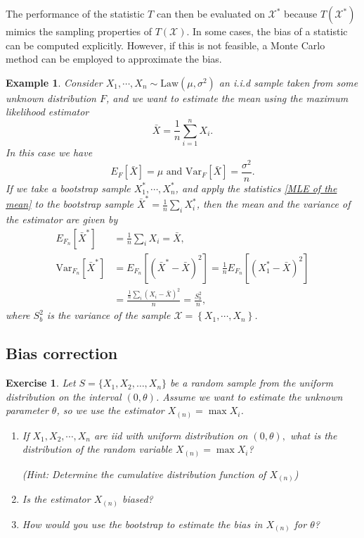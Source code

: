 \documentclass{article}\usepackage[]{graphicx}\usepackage[]{xcolor}
\newtheorem{exercise}{Exercise}
\newtheorem{example}{Example}
\begin{document}
The performance of the statistic $T$ can then be evaluated on $\mathcal{X}^*$ because $T(\mathcal{X}^*)$ mimics the sampling properties of $T(\mathcal{X})$. In some cases, the bias of a statistic can be computed explicitly. However, if this is not feasible, a Monte Carlo method can be employed to approximate the bias.


\begin{example}
Consider $X_1,\cdots, X_n \sim \text{Law}(\mu,\sigma^2)$ an i.i.d sample taken from some unknown distribution $F$, and we want to estimate the mean using the maximum likelihood estimator
\begin{equation}\label{MLE of the mean}
\bar{X} = \frac{1}{n} \sum\limits_{i=1}^nX_i.
\end{equation}
In this case we have 
\begin{equation}
E_F\left[ \bar{X} \right] = \mu \text{ and } \text{Var}_F\left[\bar{X}\right] = \frac{\sigma^2}{n}.
\end{equation}
If we take a bootstrap sample $X_1^*, \cdots, X_n^*$, and apply the statistics \eqref{MLE of the mean} to the bootstrap sample $\bar{X}^* = \frac{1}{n}\sum\limits_i X_i^*$, then the mean and the variance of the estimator are given by 
\begin{align*}
E_{F_n}\left[\bar{X}^*\right] &= \frac{1}{n}\sum\limits_i X_i = \bar{X},\\
\text{Var}_{F_n}\left[ \bar{X}^*\right] &= E_{F_n}\left[ \left(\bar{X}^* -\bar{X}\right)^2 \right]=\frac{1}{n}E_{F_n}\left[ \left( X_1^* - \bar{X}\right)^2 \right]\\
&= \frac{\frac{1}{n}\sum\limits_i (X_i - \bar{X})^2}{n} = \frac{S_b^2}{n},
\end{align*}
where $S_b^2$ is the variance of the sample $\mathcal{X} = \left\lbrace X_1, \cdots, X_n\right\rbrace$.
\end{example}

\subsection{Bias correction}

\begin{exercise}
Let $S = \lbrace X_1, X_2, \ldots, X_n \rbrace$ be a random sample from the uniform distribution on the interval $(0, \theta)$. Assume we want to estimate the unknown parameter $\theta$, so we use the estimator $X_{(n)} = \max X_i$.

\begin{enumerate}
\item If $X_1,X_2,\cdots, X_n$ are iid with uniform distribution on $(0,\theta),$ what is the distribution of the random variable $X_{(n)} = \max X_i$? 

(Hint: Determine the cumulative distribution function of $X_{(n)}$)

\item Is the estimator $X_{(n)}$ biased?

\item How would you use the bootstrap to estimate the bias in $X_{(n)}$ for $\theta$?
\end{enumerate}

\end{exercise}
\end{document}
